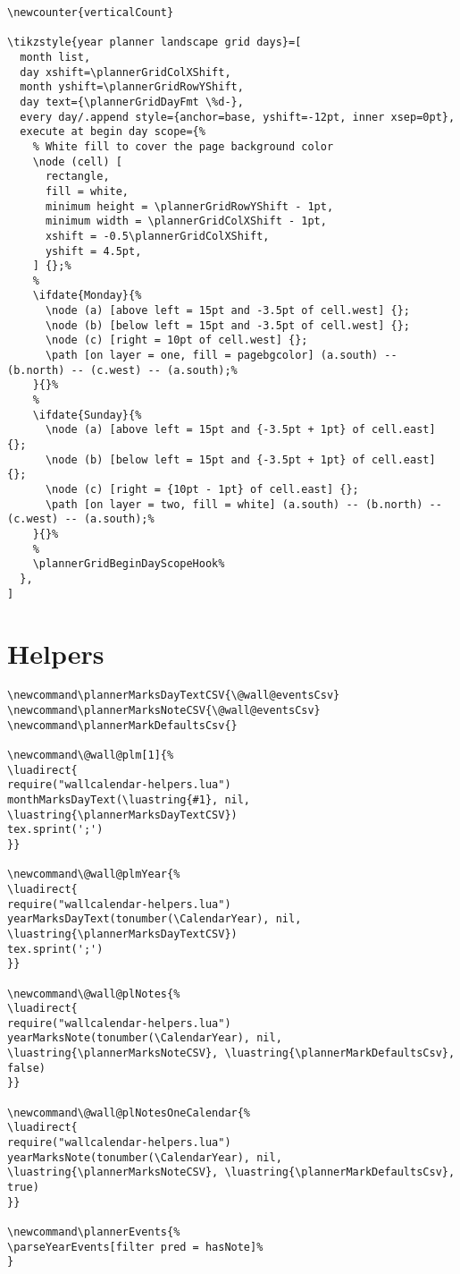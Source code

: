\documentclass[11pt,oneside]{memoir-article}
\begin{document}
\begin{verbatim}
\newcounter{verticalCount}

\tikzstyle{year planner landscape grid days}=[
  month list,
  day xshift=\plannerGridColXShift,
  month yshift=\plannerGridRowYShift,
  day text={\plannerGridDayFmt \%d-},
  every day/.append style={anchor=base, yshift=-12pt, inner xsep=0pt},
  execute at begin day scope={%
    % White fill to cover the page background color
    \node (cell) [
      rectangle,
      fill = white,
      minimum height = \plannerGridRowYShift - 1pt,
      minimum width = \plannerGridColXShift - 1pt,
      xshift = -0.5\plannerGridColXShift,
      yshift = 4.5pt,
    ] {};%
    %
    \ifdate{Monday}{%
      \node (a) [above left = 15pt and -3.5pt of cell.west] {};
      \node (b) [below left = 15pt and -3.5pt of cell.west] {};
      \node (c) [right = 10pt of cell.west] {};
      \path [on layer = one, fill = pagebgcolor] (a.south) -- (b.north) -- (c.west) -- (a.south);%
    }{}%
    %
    \ifdate{Sunday}{%
      \node (a) [above left = 15pt and {-3.5pt + 1pt} of cell.east] {};
      \node (b) [below left = 15pt and {-3.5pt + 1pt} of cell.east] {};
      \node (c) [right = {10pt - 1pt} of cell.east] {};
      \path [on layer = two, fill = white] (a.south) -- (b.north) -- (c.west) -- (a.south);%
    }{}%
    %
    \plannerGridBeginDayScopeHook%
  },
]
\end{verbatim}
\section{Helpers}
\label{sec:orge7ff03a}

\begin{verbatim}
\newcommand\plannerMarksDayTextCSV{\@wall@eventsCsv}
\newcommand\plannerMarksNoteCSV{\@wall@eventsCsv}
\newcommand\plannerMarkDefaultsCsv{}

\newcommand\@wall@plm[1]{%
\luadirect{
require("wallcalendar-helpers.lua")
monthMarksDayText(\luastring{#1}, nil, \luastring{\plannerMarksDayTextCSV})
tex.sprint(';')
}}

\newcommand\@wall@plmYear{%
\luadirect{
require("wallcalendar-helpers.lua")
yearMarksDayText(tonumber(\CalendarYear), nil, \luastring{\plannerMarksDayTextCSV})
tex.sprint(';')
}}

\newcommand\@wall@plNotes{%
\luadirect{
require("wallcalendar-helpers.lua")
yearMarksNote(tonumber(\CalendarYear), nil, \luastring{\plannerMarksNoteCSV}, \luastring{\plannerMarkDefaultsCsv}, false)
}}

\newcommand\@wall@plNotesOneCalendar{%
\luadirect{
require("wallcalendar-helpers.lua")
yearMarksNote(tonumber(\CalendarYear), nil, \luastring{\plannerMarksNoteCSV}, \luastring{\plannerMarkDefaultsCsv}, true)
}}

\newcommand\plannerEvents{%
\parseYearEvents[filter pred = hasNote]%
}

\end{verbatim}
\end{document}
